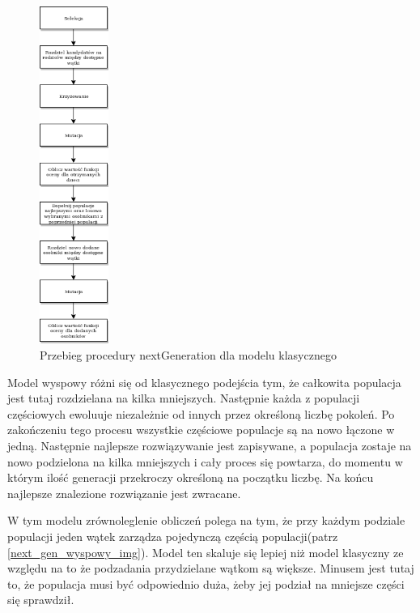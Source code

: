 \begin{figure}[H]
    \centering        
    \includegraphics[width=0.2\textwidth]{img/next_gen_klasyczny.png}
    \caption{Przebieg procedury nextGeneration dla modelu klasycznego}
    \label{next_gen_klasyczny_img}
\end{figure}

Model wyspowy różni się od klasycznego podejścia tym, że całkowita populacja jest tutaj rozdzielana na kilka mniejszych. Następnie każda z 
populacji częściowych ewoluuje niezależnie od innych przez określoną liczbę pokoleń. Po zakończeniu tego procesu wszystkie częściowe populacje 
są na nowo łączone w jedną. Następnie najlepsze rozwiązywanie jest zapisywane, a populacja zostaje na nowo podzielona na kilka mniejszych i 
cały proces się powtarza, do momentu w którym ilość generacji przekroczy określoną na początku liczbę. Na końcu najlepsze znalezione rozwiązanie 
jest zwracane.

W tym modelu zrównoleglenie obliczeń polega na tym, że przy każdym podziale populacji jeden wątek zarządza pojedynczą częścią populacji(patrz \ref{next_gen_wyspowy_img}).
Model ten skaluje się lepiej niż model klasyczny ze względu na to że podzadania przydzielane wątkom są większe. Minusem jest tutaj to, że populacja 
musi być odpowiednio duża, żeby jej podział na mniejsze części się sprawdził.

